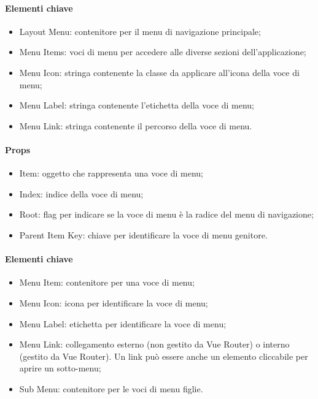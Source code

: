 
\paragraph*{Elementi chiave}
\begin{itemize}
  \item Layout Menu: contenitore per il menu di navigazione principale;
  \item Menu Items: voci di menu per accedere alle diverse sezioni dell'applicazione;
  \item Menu Icon: stringa contenente la classe da applicare all'icona della voce di menu;
  \item Menu Label: stringa contenente l'etichetta della voce di menu;
  \item Menu Link: stringa contenente il percorso della voce di menu.
\end{itemize}


\paragraph*{Props}
\begin{itemize}
  \item Item: oggetto che rappresenta una voce di menu;
  \item Index: indice della voce di menu;
  \item Root: flag per indicare se la voce di menu è la radice del menu di navigazione;
  \item Parent Item Key: chiave per identificare la voce di menu genitore.
\end{itemize}

\paragraph*{Elementi chiave}
\begin{itemize}
  \item Menu Item: contenitore per una voce di menu;
  \item Menu Icon: icona per identificare la voce di menu;
  \item Menu Label: etichetta per identificare la voce di menu;
  \item Menu Link: collegamento esterno (non gestito da Vue Router) o interno (gestito da Vue Router). Un link può essere anche un elemento cliccabile per aprire un sotto-menu;
  \item Sub Menu: contenitore per le voci di menu figlie.
\end{itemize}

